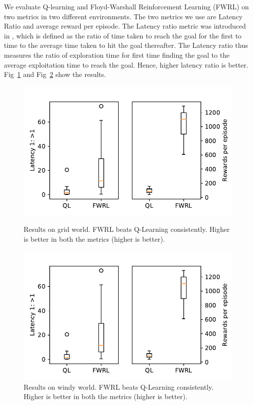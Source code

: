 \documentclass[letterpaper]{article} %
\begin{document}
We evaluate Q-learning and Floyd-Warshall Reinforcement Learning (FWRL)  on two
metrics in two different environments. The two metrics we use are Latency Ratio
and average reward per episode. The Latency ratio metric was introduced in
\citet{MiPaViICLR2017}, which is defined as the ratio of time taken to reach the
goal for the first to time to the average time taken to hit the goal thereafter.
The Latency ratio thus measures the ratio of exploration time for first time
finding the goal to the average exploitation time to reach the goal. Hence,
higher latency ratio is better.
Fig~\ref{fig:ql-fw-grid-world-results} and
Fig~\ref{fig:ql-fw-windy-world-results} show the results.

\begin{figure}%
\includegraphics[width=\columnwidth]{./media/ql-fw-grid-world.pdf}\\
\caption{Results on grid world. FWRL beats Q-Learning consistently. Higher is
  better in both the metrics (higher is better).}
\label{fig:ql-fw-grid-world-results}%
\end{figure}
\begin{figure}
\includegraphics[width=\columnwidth]{./media/ql-fw-windy-world.pdf}%
\caption{Results on windy world. FWRL beats Q-Learning consistently. Higher is
  better in both the metrics (higher is better).}
\label{fig:ql-fw-windy-world-results}%
\end{figure}
\end{document}
